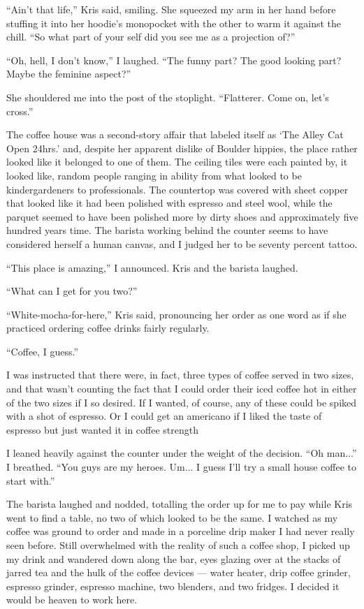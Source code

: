 ``Ain't that life,'' Kris said, smiling.  She squeezed my arm in her hand before stuffing it into her hoodie's monopocket with the other to warm it against the chill.  ``So what part of your self did you see me as a projection of?''

``Oh, hell, I don't know,'' I laughed.  ``The funny part?  The good looking part?  Maybe the feminine aspect?''

She shouldered me into the post of the stoplight.  ``Flatterer.  Come on, let's cross.''

The coffee house was a second-story affair that labeled itself as `The Alley Cat Open 24hrs.' and, despite her apparent dislike of Boulder hippies, the place rather looked like it belonged to one of them.  The ceiling tiles were each painted by, it looked like, random people ranging in ability from what looked to be kindergardeners to professionals.  The countertop was covered with sheet copper that looked like it had been polished with espresso and steel wool, while the parquet seemed to have been polished more by dirty shoes and approximately five hundred years time.  The barista working behind the counter seems to have considered herself a human canvas, and I judged her to be seventy percent tattoo.

``This place is amazing,'' I announced.  Kris and the barista laughed.

``What can I get for you two?''

``White-mocha-for-here,'' Kris said, pronouncing her order as one word as if she practiced ordering coffee drinks fairly regularly.

``Coffee, I guess.''

I was instructed that there were, in fact, three types of coffee served in two sizes, and that wasn't counting the fact that I could order their iced coffee hot in either of the two sizes if I so desired.  If I wanted, of course, any of these could be spiked with a shot of espresso.  Or I could get an americano if I liked the taste of espresso but just wanted it in coffee strength

I leaned heavily against the counter under the weight of the decision.  ``Oh man...'' I breathed.  ``You guys are my heroes.  Um... I guess I'll try a small house coffee to start with.''

The barista laughed and nodded, totalling the order up for me to pay while Kris went to find a table, no two of which looked to be the same.  I watched as my coffee was ground to order and made in a porceline drip maker I had never really seen before.  Still overwhelmed with the reality of such a coffee shop, I picked up my drink and wandered down along the bar, eyes glazing over at the stacks of jarred tea and the hulk of the coffee devices --- water heater, drip coffee grinder, espresso grinder, espresso machine, two blenders, and two fridges.  I decided it would be heaven to work here.

